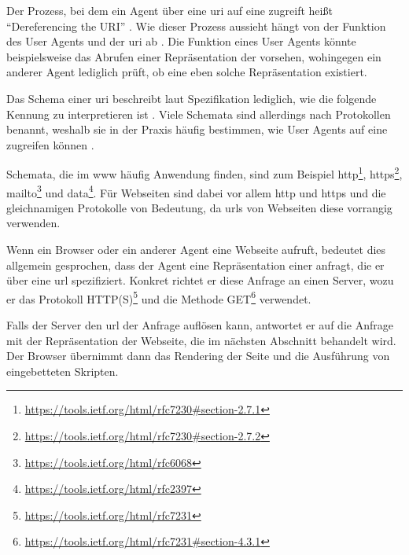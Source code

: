         Der Prozess, bei dem ein Agent über eine \gls{uri} auf eine {\resource}
        zugreift heißt "`Dereferencing the URI"' \cite[Kapitel 3.1]{w3c:wwwArch}.
        Wie dieser Prozess aussieht hängt von der Funktion des User Agents und der \gls{uri} ab
        \cite[Kapitel 3.1]{w3c:wwwArch}.
        Die Funktion eines User Agents könnte beispielsweise das Abrufen einer
        Repräsentation der {\resource} vorsehen, wohingegen ein anderer Agent
        lediglich prüft, ob eine eben solche Repräsentation existiert.

        Das Schema einer \gls{uri} beschreibt laut Spezifikation
        lediglich, wie die folgende Kennung zu interpretieren ist
        \cite[Kapitel 3.1, Seite 17]{rfc:3986}.
        Viele Schemata sind allerdings nach Protokollen benannt,
        weshalb sie in der Praxis häufig bestimmen,
        wie User Agents auf eine {\resource} zugreifen können
        \cite[Kapitel 3.1]{w3c:wwwArch}.
        
        Schemata, die im \gls{www} häufig Anwendung finden,
        sind zum Beispiel
        http\footnote{\url{https://tools.ietf.org/html/rfc7230\#section-2.7.1}},
        https\footnote{\url{https://tools.ietf.org/html/rfc7230\#section-2.7.2}},
        mailto\footnote{\url{https://tools.ietf.org/html/rfc6068}} und
        data\footnote{\url{https://tools.ietf.org/html/rfc2397}}.
        Für Webseiten sind dabei vor allem http und https
        und die gleichnamigen Protokolle von Bedeutung,
        da \glspl{url} von Webseiten diese vorrangig verwenden.

        Wenn ein Browser oder ein anderer Agent eine Webseite aufruft,
        bedeutet dies allgemein gesprochen, dass der Agent eine Repräsentation
        einer {\resource} anfragt, die er über eine \gls{url} spezifiziert.
        Konkret richtet er diese Anfrage an einen Server,
        wozu er das Protokoll HTTP(S)\footnote{\url{https://tools.ietf.org/html/rfc7231}} und die Methode
        GET\footnote{\url{https://tools.ietf.org/html/rfc7231\#section-4.3.1}} verwendet.

        Falls der Server den \gls{url} der Anfrage auflösen kann,
        antwortet er auf die Anfrage mit der Repräsentation der Webseite,
        die im nächsten Abschnitt behandelt wird.
        Der Browser übernimmt dann das Rendering der Seite und die Ausführung
        von eingebetteten Skripten.

